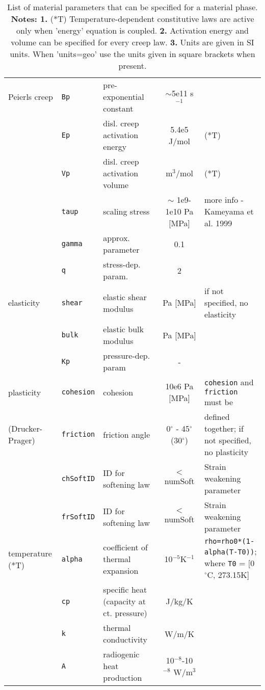\documentclass[a4paper,11pt]{article}
\begin{document}
\begin{table}[H]
\begin{center}
{\begin{tabular}{p{2.7cm} p{2cm} p{3cm} c p{5cm}}
\hdashline
Peierls creep&\texttt{Bp}&pre-exponential constant&$\sim$5e11 s$^{-1}$&\\
&\texttt{Ep}&disl. creep activation energy&5.4e5 J/mol&(*T) \\
&\texttt{Vp}&disl. creep activation volume&m$^3$/mol&(*T) \\
&\texttt{taup}&scaling stress&$\sim$ 1e9-1e10 Pa [MPa]& more info - Kameyama et al. 1999 \\
&\texttt{gamma}&approx. parameter&0.1& \\
&\texttt{q}&stress-dep. param.&2& \\

\hdashline
elasticity&\texttt{shear}&elastic shear modulus&Pa [MPa]&if not specified, no elasticity\\
&\texttt{bulk}&elastic bulk modulus&Pa [MPa]&\\
&\texttt{Kp}&pressure-dep. param&-&\\

\hdashline
plasticity &\texttt{cohesion}&cohesion&10e6 Pa [MPa]&\texttt{cohesion} and \texttt{friction} must be \\
(Drucker-Prager)&\texttt{friction}&friction angle&0$^\circ$ - 45$^\circ$ (30$^\circ$)&defined together; if not specified, no plasticity\\
&\texttt{chSoftID}&ID for softening law&$<$ numSoft&Strain weakening parameter\\
&\texttt{frSoftID}&ID for softening law&$<$ numSoft&Strain weakening parameter\\


\hdashline
temperature  (*T)&\texttt{alpha}&coefficient of thermal expansion&10$^{-5}$K$^{-1}$&\texttt{rho=rho0*(1-alpha(T-T0))}; where \texttt{T0} = [0$^\circ$C, 273.15K]\\
&\texttt{cp}&specific heat (capacity at ct. pressure)&J/kg/K&\\
&\texttt{k}&thermal conductivity&W/m/K&\\
&\texttt{A}&radiogenic heat production&10$^{-8}$-10$^{-8}$ W/m$^3$ &\\

 \hline
     \end{tabular}
     }
  \caption{List of material parameters that can be specified for a material phase. \textbf{Notes: 1.} (*T) Temperature-dependent constitutive laws are active only when 'energy' equation is coupled. \textbf{2.} Activation energy and volume can be specified for every creep law. \textbf{3.} Units are given in SI units. When 'units=geo' use the units given in square brackets when present. }
  \label{tab:matprops}
  \end{center}
\end{table}
\end{document}

